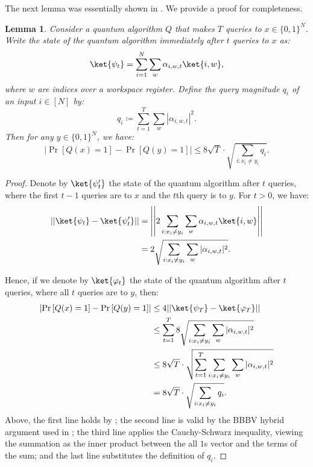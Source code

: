 \documentclass[10pt,a4paper]{article}
\newtheorem{lemma}[theorem]{Lemma}
\begin{document}
The next lemma was essentially shown in \cite{BBBV97}. We provide a proof for completeness.
\begin{lemma}
\label{lem:bbbv_query_magnitude}
Consider a quantum algorithm $Q$ that makes $T$ queries to $x \in \{0,1\}^N$. Write the state of the quantum algorithm immediately after $t$ queries to $x$ as:
\[\ket{\psi_t} = \sum_{i=1}^N \sum_{w} \alpha_{i,w,t}\ket{i,w},\]
where $w$ are indices over a workspace register. Define the \emph{query magnitude} $q_i$ of an input $i \in [N]$ by:
\[q_i \coloneqq \sum_{t=1}^{T} \sum_w \left| \alpha_{i,w,t} \right|^2. \]
Then for any $y \in \{0,1\}^N$, we have:
\[
\left|\Pr\left[Q(x) = 1 \right] - \Pr\left[Q(y) = 1 \right] \right| \le 8\sqrt{T} \cdot \sqrt{\sum_{i : x_i \neq y_i} q_i}.
\]
\end{lemma}

\begin{proof}
Denote by $\ket{\psi'_t}$ the state of the quantum algorithm after $t$ queries, where the first $t-1$ queries are to $x$ and the $t$th query is to $y$. For $t > 0$, we have:
\begin{align*}
|| \ket{\psi_t} - \ket{\psi'_t} || &= \left|\left| 2 \sum_{i : x_i \neq y_i} \sum_{w} \alpha_{i,w,t} \ket{i,w} \right|\right|\\
&= 2\sqrt{\sum_{i : x_i \neq y_i} \sum_{w} |\alpha_{i,w,t}|^2}.
\end{align*}

Hence, if we denote by $\ket{\varphi_t}$ the state of the quantum algorithm after $t$ queries, where all $t$ queries are to $y$, then:
\begin{align*}
\left|\Pr\left[Q(x) = 1 \right] - \Pr\left[Q(y) = 1 \right] \right| & \le 4||\ket{\psi_T} - \ket{\varphi_T}||\\ &\le \sum_{t=1}^T 8\sqrt{\sum_{i : x_i \neq y_i} \sum_{w} |\alpha_{i,w,t}|^2}\\
&\le 8\sqrt{T} \cdot \sqrt{\sum_{t=1}^T \sum_{i : x_i \neq y_i} \sum_w |\alpha_{i,w,t}|^2}\\
&= 8\sqrt{T} \cdot \sqrt{\sum_{i : x_i \neq y_i} q_i}.
\end{align*}
Above, the first line holds by \cite[Lemma 3.6]{BV97}; the second line is valid by the BBBV hybrid argument used in \cite[Theorem 3.3]{BBBV97}; the third line applies the Cauchy-Schwarz inequality, viewing the summation as the inner product between the all $1$s vector and the terms of the sum; and the last line substitutes the definition of $q_i$.
\end{proof}
\end{document}
